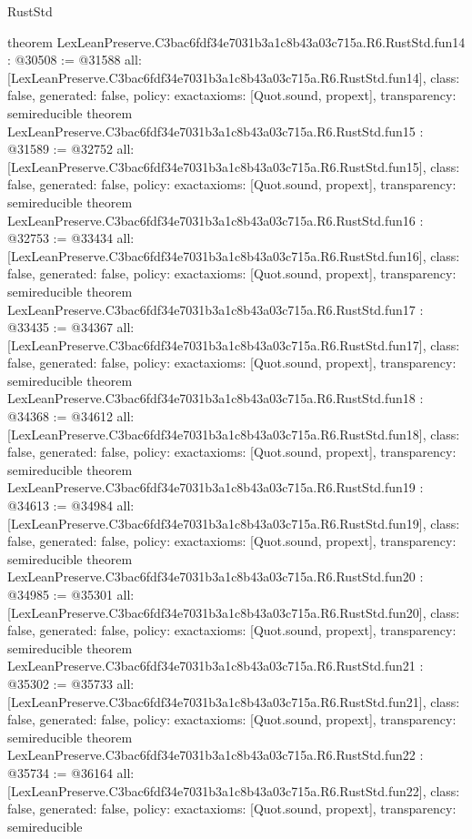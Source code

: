 \begin{lexlean}{RustStd}
\begin{coremodule}
{}
theorem LexLeanPreserve.C3bac6fdf34e7031b3a1c8b43a03c715a.R6.RustStd.fun14 : @30508 := @31588 {
  all: [LexLeanPreserve.C3bac6fdf34e7031b3a1c8b43a03c715a.R6.RustStd.fun14],
  class: false,
  generated: false,
  policy: exact{axioms: [Quot.sound, propext]},
  transparency: semireducible
}
theorem LexLeanPreserve.C3bac6fdf34e7031b3a1c8b43a03c715a.R6.RustStd.fun15 : @31589 := @32752 {
  all: [LexLeanPreserve.C3bac6fdf34e7031b3a1c8b43a03c715a.R6.RustStd.fun15],
  class: false,
  generated: false,
  policy: exact{axioms: [Quot.sound, propext]},
  transparency: semireducible
}
theorem LexLeanPreserve.C3bac6fdf34e7031b3a1c8b43a03c715a.R6.RustStd.fun16 : @32753 := @33434 {
  all: [LexLeanPreserve.C3bac6fdf34e7031b3a1c8b43a03c715a.R6.RustStd.fun16],
  class: false,
  generated: false,
  policy: exact{axioms: [Quot.sound, propext]},
  transparency: semireducible
}
theorem LexLeanPreserve.C3bac6fdf34e7031b3a1c8b43a03c715a.R6.RustStd.fun17 : @33435 := @34367 {
  all: [LexLeanPreserve.C3bac6fdf34e7031b3a1c8b43a03c715a.R6.RustStd.fun17],
  class: false,
  generated: false,
  policy: exact{axioms: [Quot.sound, propext]},
  transparency: semireducible
}
theorem LexLeanPreserve.C3bac6fdf34e7031b3a1c8b43a03c715a.R6.RustStd.fun18 : @34368 := @34612 {
  all: [LexLeanPreserve.C3bac6fdf34e7031b3a1c8b43a03c715a.R6.RustStd.fun18],
  class: false,
  generated: false,
  policy: exact{axioms: [Quot.sound, propext]},
  transparency: semireducible
}
theorem LexLeanPreserve.C3bac6fdf34e7031b3a1c8b43a03c715a.R6.RustStd.fun19 : @34613 := @34984 {
  all: [LexLeanPreserve.C3bac6fdf34e7031b3a1c8b43a03c715a.R6.RustStd.fun19],
  class: false,
  generated: false,
  policy: exact{axioms: [Quot.sound, propext]},
  transparency: semireducible
}
theorem LexLeanPreserve.C3bac6fdf34e7031b3a1c8b43a03c715a.R6.RustStd.fun20 : @34985 := @35301 {
  all: [LexLeanPreserve.C3bac6fdf34e7031b3a1c8b43a03c715a.R6.RustStd.fun20],
  class: false,
  generated: false,
  policy: exact{axioms: [Quot.sound, propext]},
  transparency: semireducible
}
theorem LexLeanPreserve.C3bac6fdf34e7031b3a1c8b43a03c715a.R6.RustStd.fun21 : @35302 := @35733 {
  all: [LexLeanPreserve.C3bac6fdf34e7031b3a1c8b43a03c715a.R6.RustStd.fun21],
  class: false,
  generated: false,
  policy: exact{axioms: [Quot.sound, propext]},
  transparency: semireducible
}
theorem LexLeanPreserve.C3bac6fdf34e7031b3a1c8b43a03c715a.R6.RustStd.fun22 : @35734 := @36164 {
  all: [LexLeanPreserve.C3bac6fdf34e7031b3a1c8b43a03c715a.R6.RustStd.fun22],
  class: false,
  generated: false,
  policy: exact{axioms: [Quot.sound, propext]},
  transparency: semireducible
}
\end{coremodule}
\end{lexlean}
